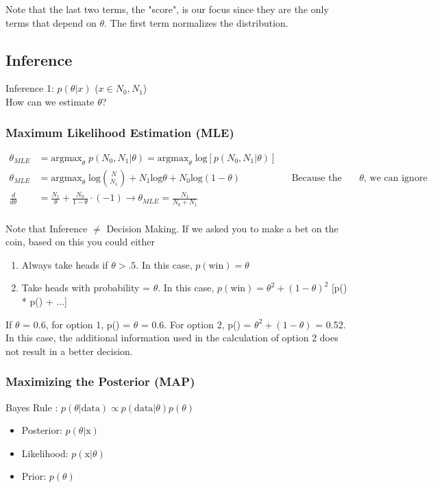 \documentclass{article}
\begin{document}
\noindent Note that the last two terms, the "score", is our focus since they are the only terms that depend on $\theta$. The first term normalizes the distribution. \\

\subsection{Inference}

Inference 1: $p(\theta|x)$ ($x \in N_0, N_1$) \\
How can we estimate $\theta$? \\

\subsubsection*{Maximum Likelihood Estimation (MLE)}

\begin{align*}
\theta_{MLE} &= \textrm{argmax}_{\theta} \; p(N_0,N_1 | \theta) = \textrm{argmax}_{\theta}  \;\textrm{log}\left[p(N_0,N_1 | \theta)\right] \\
\theta_{MLE} &= \textrm{argmax}_{\theta} \;\textrm{log}{N \choose N_1} + N_1 \textrm{log} \theta + N_0  \textrm{log} (1-\theta) && \text{Because the first term is not a function of $\theta$, we can ignore it.} \\
\frac{d}{d\theta} &= \frac{N_1}{\theta} + \frac{N_0}{1-\theta} \cdot ( -1)  \rightarrow \theta_{MLE} = \frac{N_1}{N_0 + N_1} \\
\end{align*}

\noindent Note that Inference $\neq$ Decision Making. If we asked you to make a bet on the coin, based on this you could either
\begin{enumerate}
\item Always take heads if $\theta > .5$. In this case, $p(\text{win}) = \theta$
\item Take heads with probability = $\theta$. In this case, $p(\text{win}) = \theta^2 + (1-\theta)^2$ [p() * p() + ...]
\end{enumerate}
If $\theta$ = 0.6, for option 1, p() = $\theta$ = 0.6. For option 2, p() = $\theta^2 + (1 - \theta)$ = 0.52. In this case, the additional information used in the calculation of option 2 does not result in a better decision.


\subsubsection*{Maximizing the Posterior (MAP)}
Bayes Rule : $p(\theta|\text{data}) \propto p(\text{data}|\theta) p(\theta)$
\begin{itemize}
\item Posterior: $p(\theta | \text{x})$
\item Likelihood: $p(\text{x} | \theta)$
\item Prior: $p(\theta)$
\end{itemize}
\end{document}
